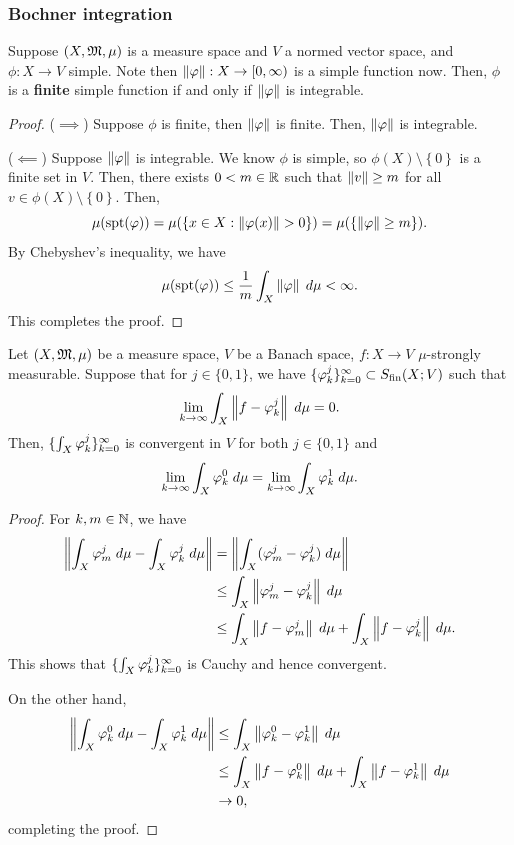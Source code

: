 \documentclass[a4paper]{article}
\begin{document}
\subsubsection{Bochner integration}
\begin{lemma}
Suppose $(X, \mathfrak{M}, \mu)$ is a measure space and $V$ a normed
vector space, and $\phi: X \to V$ simple.
Note then $\left\lVert \varphi\right\rVert : X \to [0, \infty)$
is a simple function now.
Then, $\phi$ is a \textbf{finite} simple function
if and only if $\left\lVert \varphi\right\rVert$ is integrable.
\end{lemma}

\begin{proof}
($\implies$) Suppose $\phi$ is finite, then
$\left\lVert \varphi\right\rVert$ is finite. Then, $\left\lVert \varphi\right\rVert$ is integrable.

($\impliedby$) Suppose $\left\lVert \varphi\right\rVert$ is integrable. We know
$\phi$ is simple, so $\phi(X) \setminus \left\{ 0 \right\}$
is a finite set in $V$. Then, there exists $0 < m \in \mathbb{R}$ such
that $\left\lVert v\right\rVert \geq m$ for all $v \in \phi(X) \setminus \left\{
0 \right\}$. Then,
\[
\mu(\operatorname{spt}(\varphi)) = \mu(\{x \in X : \left\lVert \varphi(x)\right\rVert > 0\})
= \mu(\{\left\lVert \varphi\right\rVert \geq m\}).
\]
By Chebyshev's inequality, we have
\[
\mu(\operatorname{spt}(\varphi)) \leq \frac{1}{m} \int_X \left\lVert \varphi\right\rVert \; d \mu < \infty.
\]
This completes the proof.
\end{proof}

\begin{lemma}
Let $(X, \mathfrak{M}, \mu)$ be a measure space, $V$ be a Banach space,
$f: X \to V$ $\mu$-strongly measurable. Suppose that for
$j \in \{0, 1\}$, we have $\{ \varphi_k^j \}_{k=0}^\infty \subset S_{\text{fin}}(X; V)$
such that
\[
  \lim_{k \to \infty} \int_X \left\lVert f - \varphi_k^j\right\rVert \; d \mu = 0.
\]
Then, $\{ \int_X \varphi_k^j \}_{k=0}^\infty$ is convergent in $V$
for both $j \in \{0, 1\}$ and
\[
\lim_{k \to \infty} \int_X \varphi_k^0 \; d \mu =
\lim_{k \to \infty} \int_X \varphi_k^1 \; d \mu.
\]
\end{lemma}

\begin{proof}
For $k, m \in \mathbb{N}$, we have
\[
\begin{aligned}
  \left\lVert \int_X \varphi_m^j \; d\mu - \int_X \varphi_k^j \; d \mu\right\rVert
  &= \left\lVert \int_X (\varphi_m^j - \varphi_k^j) \; d \mu\right\rVert \\
  &\leq \int_X \left\lVert \varphi_m^j - \varphi_k^j\right\rVert \; d \mu \\
  &\leq \int_X \left\lVert f - \varphi_m^j\right\rVert \; d \mu
  + \int_X \left\lVert f - \varphi_k^j\right\rVert \; d \mu.
\end{aligned}
\]
This shows that $\{ \int_X \varphi_k^j \}_{k=0}^\infty$ is Cauchy
and hence convergent.

On the other hand,
\[
\begin{aligned}
\left\lVert \int_X \varphi_k^0 \; d \mu - \int_X \varphi_k^1 \; d \mu\right\rVert
&\leq \int_X \left\lVert \varphi_k^0 - \varphi_k^1\right\rVert \; d \mu \\
&\leq \int_X \left\lVert f - \varphi_k^0\right\rVert \; d \mu
+ \int_X \left\lVert f - \varphi_k^1\right\rVert \; d \mu \\
&\to 0,
\end{aligned}
\]
completing the proof.
\end{proof}
\end{document}
